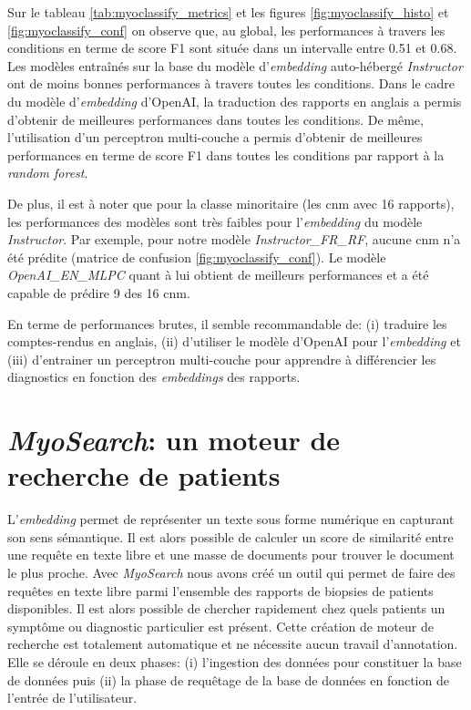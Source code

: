 Sur le tableau \ref{tab:myoclassify_metrics} et les figures \ref{fig:myoclassify_histo} et \ref{fig:myoclassify_conf} on observe que, au global, les performances à travers les conditions en terme de score F1 sont située dans un intervalle entre 0.51 et 0.68. Les modèles entraînés sur la base du modèle d'\textit{embedding} auto-hébergé \textit{Instructor} ont de moins bonnes performances à travers toutes les conditions. Dans le cadre du modèle d'\textit{embedding} d'OpenAI, la traduction des rapports en anglais a permis d'obtenir de meilleures performances dans toutes les conditions. De même, l'utilisation d'un perceptron multi-couche a permis d'obtenir de meilleures performances en terme de score F1 dans toutes les conditions par rapport à la \textit{random forest}.

De plus, il est à noter que pour la classe minoritaire (les \gls{cnm} avec 16 rapports), les performances des modèles sont très faibles pour l'\textit{embedding} du modèle \textit{Instructor}. Par exemple, pour notre modèle \textit{Instructor\_FR\_RF}, aucune \gls{cnm} n'a été prédite (matrice de confusion \ref{fig:myoclassify_conf}). Le modèle \textit{OpenAI\_EN\_MLPC} quant à lui obtient de meilleurs performances et a été capable de prédire 9 des 16 \gls{cnm}. 

En terme de performances brutes, il semble recommandable de: (i) traduire les comptes-rendus en anglais, (ii) d'utiliser le modèle d'OpenAI pour l'\textit{embedding} et (iii) d'entrainer un perceptron multi-couche pour apprendre à différencier les diagnostics en fonction des \textit{embeddings} des rapports. 

\section{\textit{MyoSearch}: un moteur de recherche de patients}
L'\textit{embedding} permet de représenter un texte sous forme numérique en capturant son sens sémantique. Il est alors possible de calculer un score de similarité entre une requête en texte libre et une masse de documents pour trouver le document le plus proche. Avec \textit{MyoSearch} nous avons créé un outil qui permet de faire des requêtes en texte libre parmi l'ensemble des rapports de biopsies de patients disponibles. Il est alors possible de chercher rapidement chez quels patients un symptôme ou diagnostic particulier est présent. Cette création de moteur de recherche est totalement automatique et ne nécessite aucun travail d'annotation. Elle se déroule en deux phases: (i) l'ingestion des données pour constituer la base de données puis (ii) la phase de requêtage de la base de données en fonction de l'entrée de l'utilisateur.

